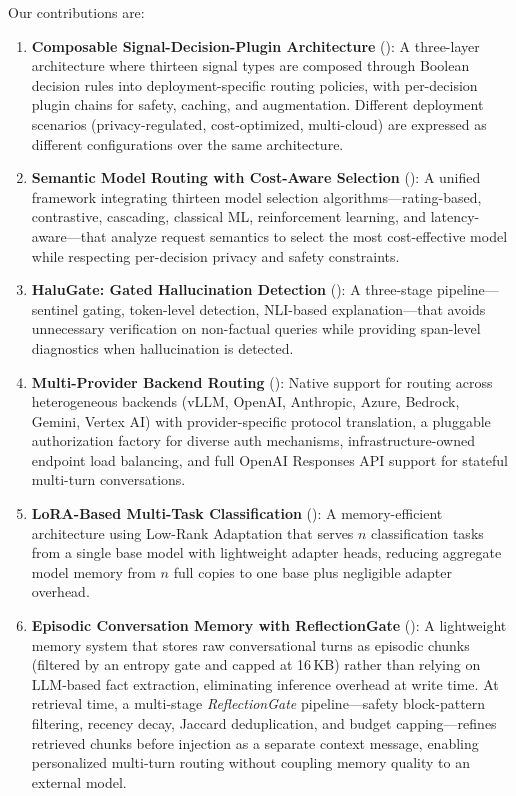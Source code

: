 Our contributions are:

\begin{enumerate}[leftmargin=*]
  \item \textbf{Composable Signal-Decision-Plugin Architecture} ():
    A three-layer architecture where thirteen signal types are composed through Boolean decision rules into deployment-specific routing policies, with per-decision plugin chains for safety, caching, and augmentation. Different deployment scenarios (privacy-regulated, cost-optimized, multi-cloud) are expressed as different configurations over the same architecture.

  \item \textbf{Semantic Model Routing with Cost-Aware Selection} ():
    A unified framework integrating thirteen model selection algorithms---rating-based, contrastive, cascading, classical ML, reinforcement learning, and latency-aware---that analyze request semantics to select the most cost-effective model while respecting per-decision privacy and safety constraints.

  \item \textbf{HaluGate: Gated Hallucination Detection} ():
    A three-stage pipeline---sentinel gating, token-level detection, NLI-based explanation---that avoids unnecessary verification on non-factual queries while providing span-level diagnostics when hallucination is detected.

  \item \textbf{Multi-Provider Backend Routing} ():
    Native support for routing across heterogeneous backends (vLLM, OpenAI, Anthropic, Azure, Bedrock, Gemini, Vertex AI) with provider-specific protocol translation, a pluggable authorization factory for diverse auth mechanisms, infrastructure-owned endpoint load balancing, and full OpenAI Responses API support for stateful multi-turn conversations.

  \item \textbf{LoRA-Based Multi-Task Classification} ():
    A memory-efficient architecture using Low-Rank Adaptation that serves $n$ classification tasks from a single base model with lightweight adapter heads, reducing aggregate model memory from $n$ full copies to one base plus negligible adapter overhead.

  \item \textbf{Episodic Conversation Memory with ReflectionGate} ():
    A lightweight memory system that stores raw conversational turns as episodic chunks (filtered by an entropy gate and capped at 16\,KB) rather than relying on LLM-based fact extraction, eliminating inference overhead at write time.
    At retrieval time, a multi-stage \emph{ReflectionGate} pipeline---safety block-pattern filtering, recency decay, Jaccard deduplication, and budget capping---refines retrieved chunks before injection as a separate context message, enabling personalized multi-turn routing without coupling memory quality to an external model.


\end{enumerate}

